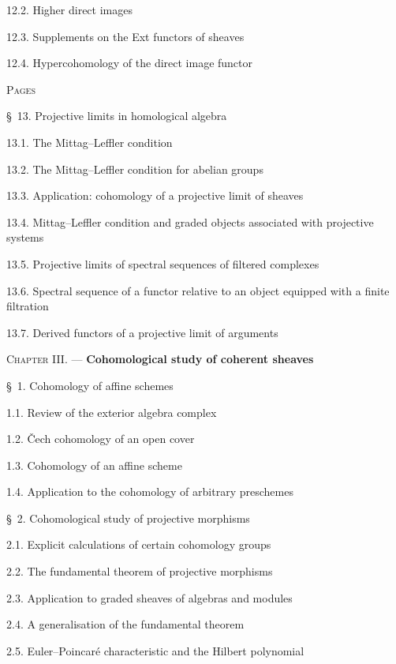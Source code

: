 \begin{flushleft}
12.2. Higher direct images 

12.3. Supplements on the Ext functors of sheaves 

12.4. Hypercohomology of the direct image functor 


\hfill\textsc{Pages}

\S~13. Projective limits in homological algebra 

13.1. The Mittag--Leffler condition 

13.2. The Mittag--Leffler condition for abelian groups 

13.3. Application: cohomology of a projective limit of sheaves 

13.4. Mittag--Leffler condition and graded objects associated with projective
systems 

13.5. Projective limits of spectral sequences of filtered complexes

13.6. Spectral sequence of a functor relative to an object equipped with a
finite filtration 

13.7. Derived functors of a projective limit of arguments 

\medskip
\textsc{Chapter III.} --- \textbf{Cohomological study of coherent sheaves}

\medskip
\S~1. Cohomology of affine schemes 

1.1. Review of the exterior algebra complex 

1.2. \v Cech cohomology of an open cover 

1.3. Cohomology of an affine scheme 

1.4. Application to the cohomology of arbitrary preschemes 

\medskip
\S~2. Cohomological study of projective morphisms 

2.1. Explicit calculations of certain cohomology groups 

2.2. The fundamental theorem of projective morphisms 

2.3. Application to graded sheaves of algebras and modules 

2.4. A generalisation of the fundamental theorem 

2.5. Euler--Poincaré characteristic and the Hilbert polynomial 


\end{flushleft}
